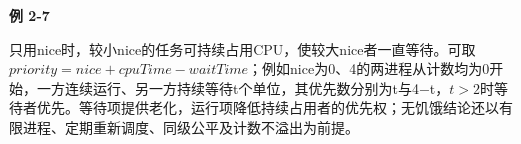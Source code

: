 {\color{ink}\bfseries 例 2-7}\par\vspace{1bp}只用nice时，较小nice的任务可持续占用CPU，使较大nice者一直等待。可取\(priority=\allowbreak{}nice+\allowbreak{}cpuTime-waitTime\)；例如nice为0、4的两进程从计数均为0开始，一方连续运行、另一方持续等待t个单位，其优先数分别为t与4\(-\)t，\(t>\allowbreak{}2\)时等待者优先。等待项提供老化，运行项降低持续占用者的优先权；无饥饿结论还以有限进程、定期重新调度、同级公平及计数不溢出为前提。
